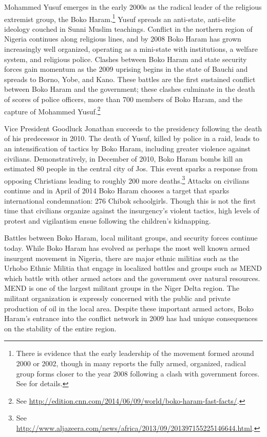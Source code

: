 Mohammed Yusuf emerges in the early 2000s as the radical leader of the religious extremist group, the Boko Haram.\footnote{There is evidence that the early leadership of the movement formed around 2000 or 2002, though in many reports the fully armed, organized, radical group forms closer to the year 2008 following a clash with government forces. See \citet{walker:2016} for details.} Yusuf spreads an anti-state, anti-elite ideology couched in Sunni Muslim teachings. Conflict in the northern region of Nigeria continues along religious lines, and by 2008 Boko Haram has grown increasingly well organized, operating as a mini-state with institutions, a welfare system, and religious police.  Clashes between Boko Haram and state security forces gain momentum as the 2009 uprising begins in the state of Bauchi and spreads to Borno, Yobe, and Kano. These battles are the first sustained conflict between Boko Haram and the government; these clashes culminate in the death of scores of police officers, more than 700 members of Boko Haram, and the capture of Mohammed Yusuf.\footnote{See \url{http://edition.cnn.com/2014/06/09/world/boko-haram-fast-facts/}.}

Vice President Goodluck Jonathan succeeds to the presidency following the death of his predecessor in 2010. The death of Yusuf, killed by police in a raid, leads to an intensification of tactics by Boko Haram, including greater violence against civilians. Demonstratively, in December of 2010, Boko Haram bombs kill an estimated 80 people in the central city of Jos. This event sparks a response from opposing Christians leading to roughly 200 more deaths.\footnote{See \url{http://www.aljazeera.com/news/africa/2013/09/201397155225146644.html}.} Attacks on civilians continue and in April of 2014 Boko Haram chooses a target that sparks international condemnation: 276 Chibok schoolgirls. Though this is not the first time that civilians organize against the insurgency's violent tactics, high levels of protest and vigilantism ensue following the children's kidnapping. %
%

Battles between Boko Haram, local militant groups, and security forces continue today. While Boko Haram has evolved as perhaps the most well known armed insurgent movement in Nigeria, there are major ethnic militias such as the Urhobo Ethnic Militia that engage in localized battles and groups such as MEND which battle with other armed actors and the government over natural resources. MEND is one of the largest militant groups in the Niger Delta region. The militant organization is expressly concerned with the public and private production of oil in the local area. Despite these important armed actors, Boko Haram's entrance into the conflict network in 2009 has had unique consequences on the stability of the entire region.

